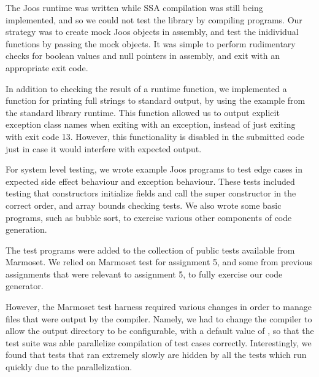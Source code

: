 \documentclass[pdftex,11pt,a4paper]{article}
\begin{document}
The Joos runtime was written while SSA compilation was still being
implemented, and so we could not test the library by compiling
programs. Our strategy was to create mock Joos objects in assembly,
and test the inidividual functions by passing the mock objects. It was
simple to perform rudimentary checks for boolean values and null
pointers in assembly, and exit with an appropriate exit code.

In addition to checking the result of a runtime function, we
implemented a function for printing full strings to standard output,
by using the example from the standard library runtime. This function
allowed us to output explicit exception class names when exiting with
an exception, instead of just exiting with exit code 13. However, this
functionality is disabled in the submitted code just in case it would
interfere with expected output.

For system level testing, we wrote example Joos programs to test edge
cases in expected side effect behaviour and exception behaviour. These
tests included testing that constructors initialize fields and call the
super constructor in the correct order, and array bounds checking
tests. We also wrote some basic programs, such as bubble sort, to
exercise various other components of code generation.

The test programs were added to the collection of public tests
available from Marmoset. We relied on Marmoset test for assignment 5,
and some from previous assignments that were relevant to assignment 5,
to fully exercise our code generator.

However, the Marmoset test harness required various changes in order
to manage files that were output by the compiler. Namely, we had to
change the compiler to allow the output directory to be configurable,
with a default value of , so that the test suite was able
parallelize compilation of test cases correctly. Interestingly, we
found that tests that ran extremely slowly are hidden by all the tests
which run quickly due to the parallelization.
\end{document}
